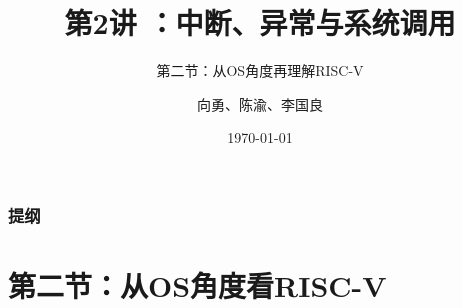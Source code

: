 


\title[第2讲]{第2讲 ：中断、异常与系统调用 } %
\subtitle{第二节：从OS角度再理解RISC-V}
\author{向勇、陈渝、李国良} %
\date{\today} %



\begin{frame}
\titlepage %
\end{frame}

\begin{frame}
\frametitle{提纲} %
\tableofcontents %
\end{frame}


\section{第二节：从OS角度看RISC-V } %
